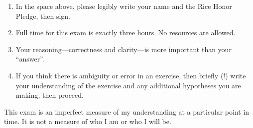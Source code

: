 \begin{enumerate}
\item In the space above, please legibly write your name and the Rice Honor Pledge, then sign.
\item Full time for this exam is exactly three hours. No resources are allowed.
\item Your reasoning---correctness and clarity---is more important than your ``answer''.
\item If you think there is ambiguity or error in an exercise, then briefly (!) write your understanding of the exercise and any additional hypotheses you are making, then proceed.
\end{enumerate}
This exam is an imperfect measure of my understanding at a particular point in time. It is not a measure of who I am or who I will be.
